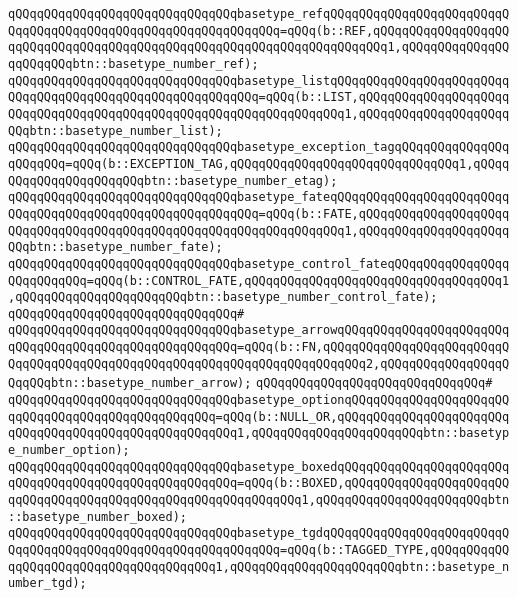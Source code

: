 \verb|qQQqqQQqqQQqqQQqqQQqqQQqqQQqqQQqbasetype_refqQQqqQQqqQQqqQQqqQQqqQQqqQQqqQQqqQQqqQQqqQQqqQQqqQQqqQQqqQQqqQQq=qQQq(b::REF,qQQqqQQqqQQqqQQqqQQqqQQqqQQqqQQqqQQqqQQqqQQqqQQqqQQqqQQqqQQqqQQqqQQqqQQq1,qQQqqQQqqQQqqQQqqQQqqQQqbtn::basetype_number_ref);|\newline
\verb|qQQqqQQqqQQqqQQqqQQqqQQqqQQqqQQqbasetype_listqQQqqQQqqQQqqQQqqQQqqQQqqQQqqQQqqQQqqQQqqQQqqQQqqQQqqQQqqQQq=qQQq(b::LIST,qQQqqQQqqQQqqQQqqQQqqQQqqQQqqQQqqQQqqQQqqQQqqQQqqQQqqQQqqQQqqQQqqQQq1,qQQqqQQqqQQqqQQqqQQqqQQqbtn::basetype_number_list);|\newline
\verb|qQQqqQQqqQQqqQQqqQQqqQQqqQQqqQQqbasetype_exception_tagqQQqqQQqqQQqqQQqqQQqqQQq=qQQq(b::EXCEPTION_TAG,qQQqqQQqqQQqqQQqqQQqqQQqqQQqqQQq1,qQQqqQQqqQQqqQQqqQQqqQQqbtn::basetype_number_etag);|\newline
\verb|qQQqqQQqqQQqqQQqqQQqqQQqqQQqqQQqbasetype_fateqQQqqQQqqQQqqQQqqQQqqQQqqQQqqQQqqQQqqQQqqQQqqQQqqQQqqQQqqQQq=qQQq(b::FATE,qQQqqQQqqQQqqQQqqQQqqQQqqQQqqQQqqQQqqQQqqQQqqQQqqQQqqQQqqQQqqQQqqQQq1,qQQqqQQqqQQqqQQqqQQqqQQqbtn::basetype_number_fate);|\newline
\verb|qQQqqQQqqQQqqQQqqQQqqQQqqQQqqQQqbasetype_control_fateqQQqqQQqqQQqqQQqqQQqqQQqqQQq=qQQq(b::CONTROL_FATE,qQQqqQQqqQQqqQQqqQQqqQQqqQQqqQQqqQQq1,qQQqqQQqqQQqqQQqqQQqqQQqbtn::basetype_number_control_fate);|\newline
\verb|qQQqqQQqqQQqqQQqqQQqqQQqqQQqqQQq#|\newline
\verb|qQQqqQQqqQQqqQQqqQQqqQQqqQQqqQQqbasetype_arrowqQQqqQQqqQQqqQQqqQQqqQQqqQQqqQQqqQQqqQQqqQQqqQQqqQQqqQQq=qQQq(b::FN,qQQqqQQqqQQqqQQqqQQqqQQqqQQqqQQqqQQqqQQqqQQqqQQqqQQqqQQqqQQqqQQqqQQqqQQqqQQq2,qQQqqQQqqQQqqQQqqQQqqQQqbtn::basetype_number_arrow);|\newline
\verb|qQQqqQQqqQQqqQQqqQQqqQQqqQQqqQQq#|\newline
\verb|qQQqqQQqqQQqqQQqqQQqqQQqqQQqqQQqbasetype_optionqQQqqQQqqQQqqQQqqQQqqQQqqQQqqQQqqQQqqQQqqQQqqQQqqQQq=qQQq(b::NULL_OR,qQQqqQQqqQQqqQQqqQQqqQQqqQQqqQQqqQQqqQQqqQQqqQQqqQQqqQQq1,qQQqqQQqqQQqqQQqqQQqqQQqbtn::basetype_number_option);|\newline
\verb|qQQqqQQqqQQqqQQqqQQqqQQqqQQqqQQqbasetype_boxedqQQqqQQqqQQqqQQqqQQqqQQqqQQqqQQqqQQqqQQqqQQqqQQqqQQqqQQq=qQQq(b::BOXED,qQQqqQQqqQQqqQQqqQQqqQQqqQQqqQQqqQQqqQQqqQQqqQQqqQQqqQQqqQQqqQQq1,qQQqqQQqqQQqqQQqqQQqqQQqbtn::basetype_number_boxed);|\newline
\verb|qQQqqQQqqQQqqQQqqQQqqQQqqQQqqQQqbasetype_tgdqQQqqQQqqQQqqQQqqQQqqQQqqQQqqQQqqQQqqQQqqQQqqQQqqQQqqQQqqQQqqQQq=qQQq(b::TAGGED_TYPE,qQQqqQQqqQQqqQQqqQQqqQQqqQQqqQQqqQQqqQQq1,qQQqqQQqqQQqqQQqqQQqqQQqbtn::basetype_number_tgd);|\newline
